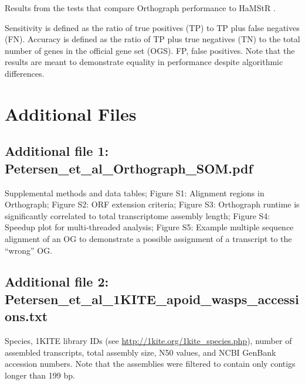 \begin{table}[h!]
\caption{Results from the tests that compare Orthograph performance to HaMStR
\citep{Ebersberger2009}.}
\par\flushleft
Sensitivity is defined as the ratio of true positives (TP) to TP plus false
negatives (FN). Accuracy is defined as the ratio of TP plus true negatives (TN)
to the total number of genes in the official gene set (OGS). FP, false
positives. Note that the results are meant to demonstrate equality in
performance despite algorithmic differences.
\end{table}


\section{Additional Files}
  \subsection{Additional file 1: Petersen\_et\_al\_Orthograph\_SOM.pdf}
		Supplemental methods and data tables;
		Figure S1: Alignment regions in Orthograph;
		Figure S2: ORF extension criteria;
		Figure S3: Orthograph runtime is significantly correlated to total transcriptome assembly length;
		Figure S4: Speedup plot for multi-threaded analysis;
		Figure S5: Example multiple sequence alignment of an OG to demonstrate a possible assignment of a transcript to the ``wrong'' OG.
	\subsection{Additional file 2: Petersen\_et\_al\_1KITE\_apoid\_wasps\_accessions.txt}
		Species, 1KITE library IDs (see \url{http://1kite.org/1kite_species.php}),
		number of assembled transcripts, total assembly size, N50 values, and NCBI
		GenBank accession numbers. Note that the assemblies were filtered to
		contain only contigs longer than 199 bp.

